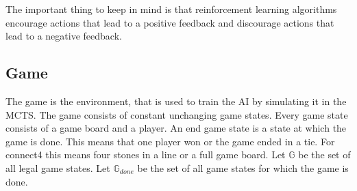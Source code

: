 \documentclass[12pt]{article}
\begin{document}
The important thing to keep in mind is that reinforcement learning algorithms encourage actions that lead to a positive feedback and discourage actions that lead to a negative feedback.
\subsection{Game}
The game is the environment, that is used to train the AI by simulating it in the MCTS. The game consists of constant unchanging game states. Every game state consists of a game board and a player. An end game state is a state at which the game is done. This means that one player won or the game ended in a tie. For connect4 this means four stones in a line or a full game board.
Let \(\mathbb{G}\) be the set of all legal game states.
Let \(\mathbb{G}_{done}\) be the set of all game states for which the game is done. 
\end{document}
